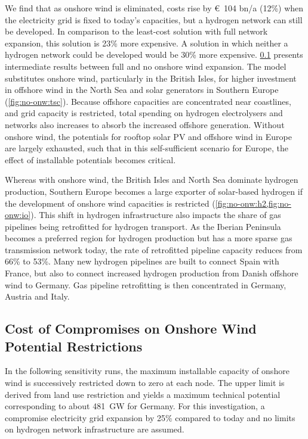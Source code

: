 We find that as onshore wind is eliminated, costs rise by \euro~104 bn/a (12\%)
when the electricity grid is fixed to today's capacities, but a hydrogen network
can still be developed. In comparison to the least-cost solution with full
network expansion, this solution is 23\% more expensive. A solution in which
neither a hydrogen network could be developed would be 30\% more expensive.
\cref{sec:si:onw} presents intermediate results between full and no onshore wind
expansion. The model substitutes onshore wind, particularly in the British
Isles, for higher investment in offshore wind in the North Sea and solar
generators in Southern Europe (\cref{fig:no-onw:tsc}). Because offshore
capacities are concentrated near coastlines, and grid capacity is restricted,
total spending on hydrogen electrolysers and networks also increases to absorb
the increased offshore generation. Without onshore wind, the potentials for
rooftop solar PV and offshore wind in Europe are largely exhausted, such that in
this self-sufficient scenario for Europe, the effect of installable potentials
becomes critical.

Whereas with onshore wind, the British Isles and North Sea dominate hydrogen
production, Southern Europe becomes a large exporter of solar-based hydrogen if
the development of onshore wind capacities is restricted
(\cref{fig:no-onw:h2,fig:no-onw:io}). This shift in hydrogen infrastructure also
impacts the share of gas pipelines being retrofitted for hydrogen transport. As
the Iberian Peninsula becomes a preferred region for hydrogen production but has
a more sparse gas transmission network today, the rate of retrofitted pipeline
capacity reduces from 66\% to 53\%. Many new hydrogen pipelines are built to
connect Spain with France, but also to connect increased hydrogen production
from Danish offshore wind to Germany. Gas pipeline retrofitting is then
concentrated in Germany, Austria and Italy.

\subsection{Cost of Compromises on Onshore Wind Potential Restrictions}
\label{sec:si:onw}

In the following sensitivity runs, the maximum installable capacity of onshore
wind is successively restricted down to zero at each node. The upper limit is
derived from land use restriction and yields a maximum technical potential
corresponding to about \SI{481}{\giga\watt} for Germany. For this investigation,
a compromise electricity grid expansion by 25\% compared to today and no limits
on hydrogen network infrastructure are assumed.

